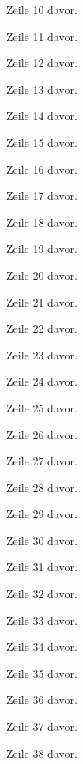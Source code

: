 Zeile 10 davor.

Zeile 11 davor.

Zeile 12 davor.

Zeile 13 davor.

Zeile 14 davor.

Zeile 15 davor.

Zeile 16 davor.

Zeile 17 davor.

Zeile 18 davor.

Zeile 19 davor.

Zeile 20 davor.

Zeile 21 davor.

Zeile 22 davor.

Zeile 23 davor.

Zeile 24 davor.

Zeile 25 davor.

Zeile 26 davor.

Zeile 27 davor.

Zeile 28 davor.

Zeile 29 davor.

Zeile 30 davor.

Zeile 31 davor.

Zeile 32 davor.

Zeile 33 davor.

Zeile 34 davor.

Zeile 35 davor.

Zeile 36 davor.

Zeile 37 davor.

Zeile 38 davor.

